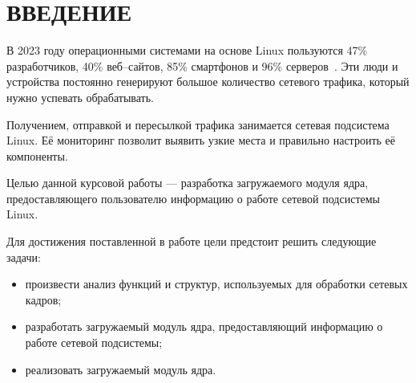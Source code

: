 \chapter*{ВВЕДЕНИЕ}

В 2023 году операционными системами на основе Linux пользуются 47\% разработчиков, 40\% веб--сайтов, 85\% смартфонов и 96\% серверов~\cite{stats}. Эти люди и устройства постоянно генерируют большое количество сетевого трафика, который нужно успевать обрабатывать.

Получением, отправкой и пересылкой трафика занимается сетевая подсистема Linux. Её мониторинг позволит выявить узкие места и правильно настроить её компоненты.

Целью данной курсовой работы --- разработка загружаемого модуля ядра, предоставляющего пользователю информацию о работе сетевой подсистемы Linux.

Для достижения поставленной в работе цели предстоит решить следующие задачи:
\begin{itemize}[label=---]
	\item произвести анализ функций и структур, используемых для обработки сетевых кадров;
	\item разработать загружаемый модуль ядра, предоставляющий информацию о работе сетевой подсистемы;
	\item реализовать загружаемый модуль ядра.
\end{itemize}
